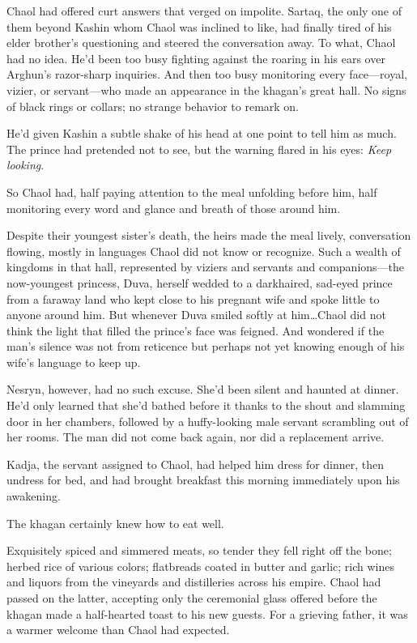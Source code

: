 Chaol had offered curt answers that verged on impolite. Sartaq, the only one of them beyond Kashin whom Chaol was inclined to like, had finally tired of his elder brother's questioning and steered the conversation away. To what, Chaol had no idea. He'd been too busy fighting against the roaring in his ears over Arghun's razor-sharp inquiries. And then too busy monitoring every face---royal, vizier, or servant---who made an appearance in the khagan's great hall. No signs of black rings or collars; no strange behavior to remark on.

He'd given Kashin a subtle shake of his head at one point to tell him as much. The prince had pretended not to see, but the warning flared in his eyes: \emph{Keep looking}.

So Chaol had, half paying attention to the meal unfolding before him, half monitoring every word and glance and breath of those around him.

Despite their youngest sister's death, the heirs made the meal lively, conversation flowing, mostly in languages Chaol did not know or recognize. Such a wealth of kingdoms in that hall, represented by viziers and servants and companions---the now-youngest princess, Duva, herself wedded to a darkhaired, sad-eyed prince from a faraway land who kept close to his pregnant wife and spoke little to anyone around him. But whenever Duva smiled softly at him\ldots Chaol did not think the light that filled the prince's face was feigned. And wondered if the man's silence was not from reticence but perhaps not yet knowing enough of his wife's language to keep up.

Nesryn, however, had no such excuse. She'd been silent and haunted at dinner. He'd only learned that she'd bathed before it thanks to the shout and slamming door in her chambers, followed by a huffy-looking male servant scrambling out of her rooms. The man did not come back again, nor did a replacement arrive.

Kadja, the servant assigned to Chaol, had helped him dress for dinner, then undress for bed, and had brought breakfast this morning immediately upon his awakening.

The khagan certainly knew how to eat well.

Exquisitely spiced and simmered meats, so tender they fell right off the bone; herbed rice of various colors; flatbreads coated in butter and garlic; rich wines and liquors from the vineyards and distilleries across his empire. Chaol had passed on the latter, accepting only the ceremonial glass offered before the khagan made a half-hearted toast to his new guests. For a grieving father, it was a warmer welcome than Chaol had expected.

